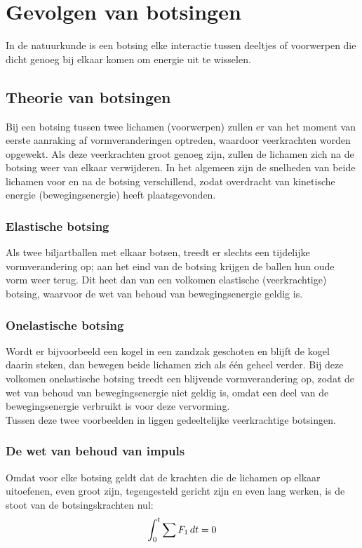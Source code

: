 \documentclass[12pt,a4paper]{article}
\begin{document}
	\newpage

	\section{Gevolgen van botsingen}
	In de natuurkunde is een botsing elke interactie tussen deeltjes of voorwerpen die dicht genoeg bij elkaar komen om energie uit te wisselen.

	\subsection{Theorie van botsingen}
	Bij een botsing tussen twee lichamen (voorwerpen) zullen er van het moment van eerste aanraking af vormveranderingen optreden, waardoor veerkrachten worden opgewekt. Als deze veerkrachten groot genoeg zijn, zullen de lichamen zich na de botsing weer van elkaar verwijderen. In het algemeen zijn de snelheden van beide lichamen voor en na de botsing verschillend, zodat overdracht van kinetische energie (bewegingsenergie) heeft plaatsgevonden.

	\subsubsection{Elastische botsing}
	Als twee biljartballen met elkaar botsen, treedt er slechts een tijdelijke vormverandering op; aan het eind van de botsing krijgen de ballen hun oude vorm weer terug. Dit heet dan van een volkomen elastische (veerkrachtige) botsing, waarvoor de wet van behoud van bewegingsenergie geldig is.

	\subsubsection{Onelastische botsing}
	Wordt er bijvoorbeeld een kogel in een zandzak geschoten en blijft de kogel daarin steken, dan bewegen beide lichamen zich als \'{e}\'{e}n geheel verder. Bij deze volkomen onelastische botsing treedt een blijvende vormverandering op, zodat de wet van behoud van bewegingsenergie niet geldig is, omdat een deel van de bewegingsenergie verbruikt is voor deze vervorming.\\ Tussen deze twee voorbeelden in liggen gedeeltelijke veerkrachtige botsingen.

	\subsubsection{De wet van behoud van impuls}
	Omdat voor elke botsing geldt dat de krachten die de lichamen op elkaar uitoefenen, even groot zijn, tegengesteld gericht zijn en even lang werken, is de stoot van de botsingskrachten nul:
	\begin{equation}
		  \int_0^t \sum F_1\,dt = 0\\
	\end{equation}
\end{document}
